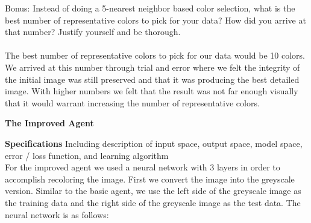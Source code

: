 \documentclass{article}
\theoremstyle{definition}
\begin{document}
 Bonus: Instead of doing a 5-nearest neighbor based color selection, what is the best number of representative colors to pick for your data? How did you arrive at that number? Justify yourself and be thorough. \\\\
 The best number of representative colors to pick for our data would be 10 colors. We arrived at this number through trial and error where we felt the integrity of the initial image was still preserved and that it was producing the best detailed image. With higher numbers we felt that the result was not far enough visually that it would warrant increasing the number of representative colors. 
  \begin{figure}[H]
    \centering
 \end{figure}

\textbf{\Large The Improved Agent} \\

    \begin{figure}[H]
        \centering
    \end{figure}

	\textbf{Specifications}
	    Including description of input space, output space, model space, error / loss function, and learning algorithm \\
        For the improved agent we used a neural network with 3 layers in order to accomplish recoloring the image. First we convert the image into the greyscale version. Similar to the basic agent, we use the left side of the greyscale image as the training data and the right side of the greyscale image as the test data.
        The neural network is as follows: \\
\end{document}
